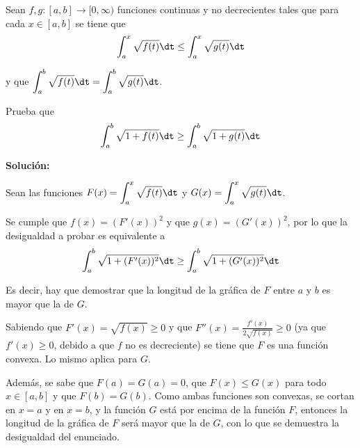 \documentclass[../../main.tex]{subfiles}
\begin{document}
  \begin{shaded}
    Sean $f, g: [a, b] \to [0, \infty)$ funciones continuas y no decrecientes tales que para cada $x \in [a, b]$ se tiene que
    $$
    \int_a^x \sqrt{f(t)}\dt \leq \int_a^x \sqrt{g(t)}\dt
    $$

    y que $\displaystyle\int_a^b \sqrt{f(t)}\dt = \displaystyle\int_a^b \sqrt{g(t)}\dt$.

    Prueba que
    $$
    \int_a^b \sqrt{1 + f(t)}\dt \geq \int_a^b \sqrt{1 + g(t)}\dt
    $$
  \end{shaded}

  \textbf{Solución:}

  Sean las funciones $F(x) = \displaystyle\int_a^x \sqrt{f(t)}\dt$ y $G(x) = \displaystyle\int_a^x \sqrt{g(t)}\dt$.

  Se cumple que $f(x) = (F'(x))^2$ y que $g(x) = (G'(x))^2$, por lo que la desigualdad a probar es equivalente a
  $$
  \int_a^b \sqrt{1 + (F'(x))^2}\dt \geq \int_a^b \sqrt{1 + (G'(x))^2}\dt
  $$

  Es decir, hay que demostrar que la longitud de la gráfica de $F$ entre $a$ y $b$ es mayor que la de $G$.

  Sabiendo que $F'(x) = \sqrt{f(x)} \geq 0$ y que $F''(x) = \frac{f'(x)}{2\sqrt{f(x)}} \geq 0$ (ya que $f'(x) \geq 0$, debido a que $f$ no es decreciente) se tiene que $F$ es una función convexa. Lo mismo aplica para $G$.

  Además, se sabe que $F(a) = G(a) = 0$, que $F(x) \leq G(x)$ para todo $x \in [a, b]$ y que $F(b) = G(b)$. Como ambas funciones son convexas, se cortan en $x = a$ y en $x = b$, y la función $G$ está por encima de la función $F$, entonces la longitud de la gráfica de $F$ será mayor que la de $G$, con lo que se demuestra la desigualdad del enunciado.
\end{document}
